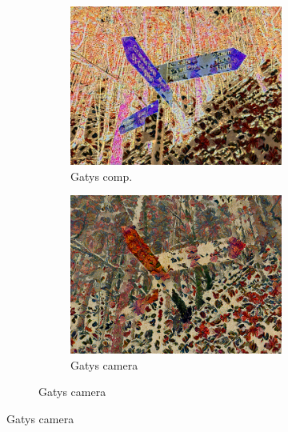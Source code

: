\begin{figure}[]
\begin{subfigure}{\textwidth}
\begin{subfigure}{0.24\textwidth}
        \end{subfigure}
        \hfill
        \begin{subfigure}{0.24\textwidth}
            \centering
            \includegraphics[width=\textwidth]{images/04-experiment02/photo/flowers/gatys_im.jpg}
            \caption*{Gatys comp.}
        \end{subfigure}
        \hfill
        \begin{subfigure}{0.24\textwidth}
            \centering
            \includegraphics[width=\textwidth]{images/04-experiment02/photo/flowers/gatys_proj.jpg}
            \caption*{Gatys camera}
        \end{subfigure}
        

\end{subfigure}
\end{figure}
